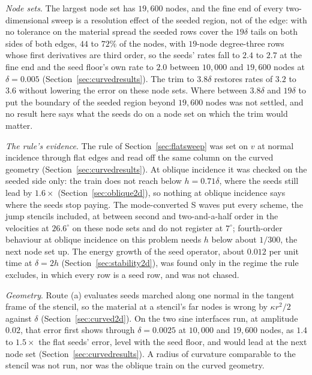 \documentclass[11pt]{amsart}
\theoremstyle{definition}
\theoremstyle{remark}
\newcommand{\para}[1]{\par\smallskip\noindent\textit{#1}.\enspace}
\begin{document}
\para{Node sets}
The largest node set has $19{,}600$ nodes, and the fine end of every
two-dimensional sweep is a resolution effect of the seeded region, not
of the edge: with no tolerance on the material spread the seeded rows
cover the $19\delta$ tails on both sides of both edges, $44$ to $72\%$
of the nodes, with $19$-node degree-three rows whose first derivatives
are third order, so the seeds' rates fall to $2.4$ to $2.7$ at the fine
end and the seed floor's own rate to $2.0$ between $10{,}000$ and
$19{,}600$ nodes at $\delta = 0.005$ (Section~\ref{sec:curvedresults}).
The trim to $3.8\delta$ restores rates of $3.2$ to $3.6$ without
lowering the error on these node sets. Where between $3.8\delta$ and
$19\delta$ to put the boundary of the seeded region beyond $19{,}600$
nodes was not settled, and no result here says what the seeds do on a
node set on which the trim would matter.

\para{The rule's evidence}
The rule of Section~\ref{sec:flatsweep} was set on $v$ at normal
incidence through flat edges and read off the same column on the curved
geometry (Section~\ref{sec:curvedresults}). At oblique incidence it was
checked on the seeded side only: the train does not reach below
$h = 0.71\delta$, where the seeds still lead by $1.6\times$
(Section~\ref{sec:oblique2d}), so nothing at oblique incidence says
where the seeds stop paying. The mode-converted S waves put every
scheme, the jump stencils included, at between second and
two-and-a-half order in the velocities at $26.6^\circ$ on these node
sets and do not register at $7^\circ$; fourth-order
behaviour at oblique incidence on this problem needs $h$ below about
$1 / 300$, the next node set up. The energy growth of the seed operator,
about $0.012$ per unit time at $\delta = 2h$
(Section~\ref{sec:stability2d}), was found only in the regime the rule
excludes, in which every row is a seed row, and was not chased.

\para{Geometry}
Route (a) evaluates seeds marched along one normal in the tangent frame
of the stencil, so the material at a stencil's far nodes is wrong by
$\kappa r^2 / 2$ against $\delta$ (Section~\ref{sec:curved2d}). On the
two sine interfaces run, at amplitude $0.02$, that error first shows
through $\delta = 0.0025$ at $10{,}000$ and $19{,}600$ nodes, as $1.4$
to $1.5\times$ the flat seeds' error, level with the seed floor, and
would lead at the next node set (Section~\ref{sec:curvedresults}). A
radius of curvature comparable to the stencil was not run, nor was the
oblique train on the curved geometry.
\end{document}
